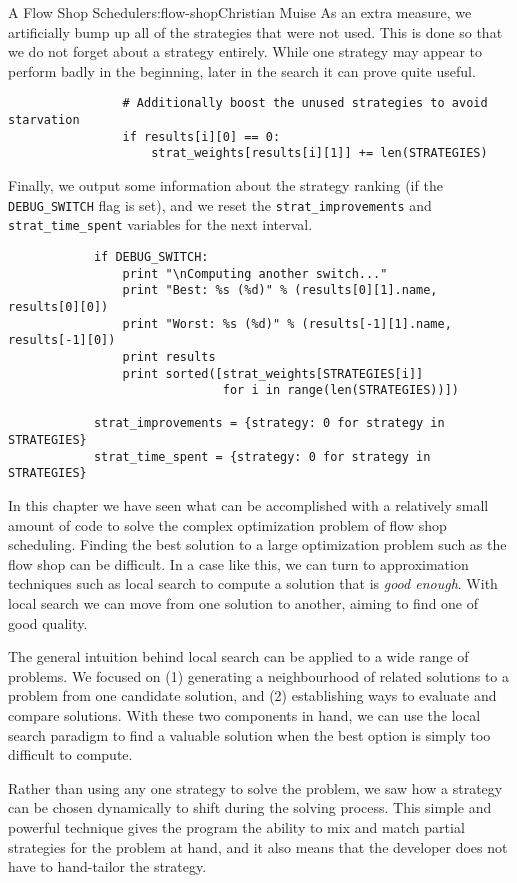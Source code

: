 \begin{aosachapter}{A Flow Shop Scheduler}{s:flow-shop}{Christian Muise}
As an extra measure, we artificially bump up all of the strategies that
were not used. This is done so that we do not forget about a strategy
entirely. While one strategy may appear to perform badly in the
beginning, later in the search it can prove quite useful.

\begin{verbatim}
                # Additionally boost the unused strategies to avoid starvation
                if results[i][0] == 0:
                    strat_weights[results[i][1]] += len(STRATEGIES)
\end{verbatim}

Finally, we output some information about the strategy ranking (if the
\texttt{DEBUG\_SWITCH} flag is set), and we reset the
\texttt{strat\_improvements} and \texttt{strat\_time\_spent} variables
for the next interval.

\begin{verbatim}
            if DEBUG_SWITCH:
                print "\nComputing another switch..."
                print "Best: %s (%d)" % (results[0][1].name, results[0][0])
                print "Worst: %s (%d)" % (results[-1][1].name, results[-1][0])
                print results
                print sorted([strat_weights[STRATEGIES[i]] 
                              for i in range(len(STRATEGIES))])

            strat_improvements = {strategy: 0 for strategy in STRATEGIES}
            strat_time_spent = {strategy: 0 for strategy in STRATEGIES}
\end{verbatim}

\label{discussion}

In this chapter we have seen what can be accomplished with a relatively
small amount of code to solve the complex optimization problem of flow
shop scheduling. Finding the best solution to a large optimization
problem such as the flow shop can be difficult. In a case like this, we
can turn to approximation techniques such as local search to compute a
solution that is \emph{good enough}. With local search we can move from
one solution to another, aiming to find one of good quality.

The general intuition behind local search can be applied to a wide range
of problems. We focused on (1) generating a neighbourhood of related
solutions to a problem from one candidate solution, and (2) establishing
ways to evaluate and compare solutions. With these two components in
hand, we can use the local search paradigm to find a valuable solution
when the best option is simply too difficult to compute.

Rather than using any one strategy to solve the problem, we saw how a
strategy can be chosen dynamically to shift during the solving process.
This simple and powerful technique gives the program the ability to mix
and match partial strategies for the problem at hand, and it also means
that the developer does not have to hand-tailor the strategy.

\end{aosachapter}
